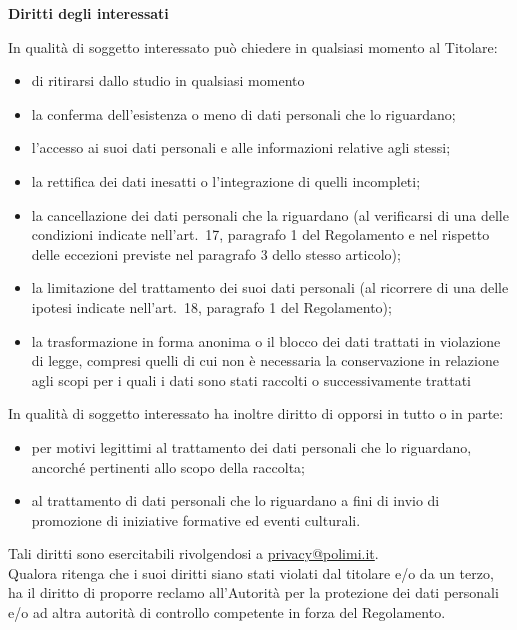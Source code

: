 \documentclass[10pt,a4paper]{article}
\newcommand{\sezione}[1]{\par\needspace{4\baselineskip}\textbf{#1}\par}
\begin{document}
\bigskip
\sezione{Diritti degli interessati}
In qualità di soggetto interessato può chiedere in qualsiasi momento al Titolare:
\begin{itemize}
  \item di ritirarsi dallo studio in qualsiasi momento
  \item la conferma dell'esistenza o meno di dati personali che lo riguardano;
  \item l'accesso ai suoi dati personali e alle informazioni relative agli stessi;
  \item la rettifica dei dati inesatti o l'integrazione di quelli incompleti;
  \item la cancellazione dei dati personali che la riguardano (al verificarsi di una delle
        condizioni indicate nell'art.~17, paragrafo 1 del Regolamento e nel rispetto delle
        eccezioni previste nel paragrafo 3 dello stesso articolo);
  \item la limitazione del trattamento dei suoi dati personali (al ricorrere di una delle
        ipotesi indicate nell'art.~18, paragrafo 1 del Regolamento);
  \item la trasformazione in forma anonima o il blocco dei dati trattati in violazione di
        legge, compresi quelli di cui non è necessaria la conservazione in relazione agli scopi
        per i quali i dati sono stati raccolti o successivamente trattati
\end{itemize}

\medskip
In qualità di soggetto interessato ha inoltre diritto di opporsi in tutto o in parte:
\begin{itemize}
  \item per motivi legittimi al trattamento dei dati personali che lo riguardano, ancorché
        pertinenti allo scopo della raccolta;
  \item al trattamento di dati personali che lo riguardano a fini di invio di promozione di
        iniziative formative ed eventi culturali.
\end{itemize}

\medskip
Tali diritti sono esercitabili rivolgendosi a \url{privacy@polimi.it}.\\
Qualora ritenga che i suoi diritti siano stati violati dal titolare e/o da un terzo, ha il
diritto di proporre reclamo all'Autorità per la protezione dei dati personali e/o ad altra
autorità di controllo competente in forza del Regolamento.
\end{document}
